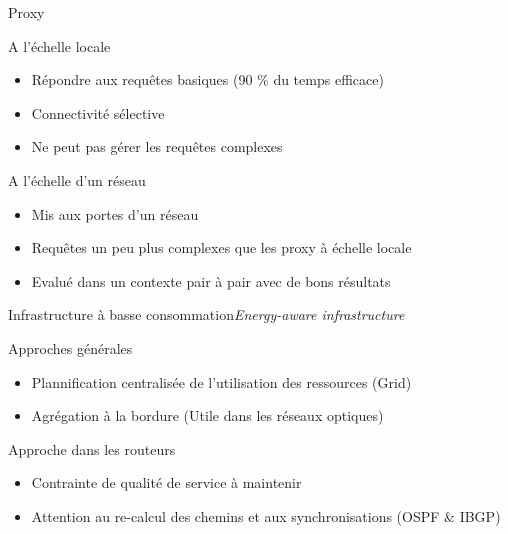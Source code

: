 \begin{frame}{Proxy}
\begin{block}{A l'échelle locale}
\begin{itemize}
\item Répondre aux requêtes basiques (90 \% du temps efficace)
\item Connectivité sélective
\item Ne peut pas gérer les requêtes complexes
\end{itemize}
\end{block}

\begin{block}{A l'échelle d'un réseau}
\begin{itemize}
\item Mis aux portes d'un réseau
\item Requêtes un peu plus complexes que les proxy à échelle locale
\item Evalué dans un contexte pair à pair avec de bons résultats
\end{itemize}
\end{block}
\end{frame}

\begin{frame}{Infrastructure à basse consommation}{\textit{Energy-aware infrastructure}}
\begin{block}{Approches générales}
\begin{itemize}
\item Plannification centralisée de l'utilisation des ressources (Grid)
\item Agrégation à la bordure (Utile dans les réseaux optiques)
\end{itemize}
\end{block}

\begin{block}{Approche dans les routeurs}
\begin{itemize}
\item Contrainte de qualité de service à maintenir
\item Attention au re-calcul des chemins et aux synchronisations (OSPF \& IBGP)
\end{itemize}
\end{block}

\end{frame}

